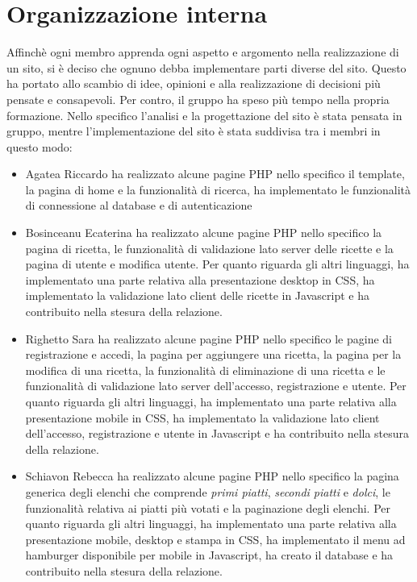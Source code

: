 \section{Organizzazione interna}
Affinchè ogni membro apprenda ogni aspetto e argomento nella realizzazione di un sito, si è deciso che ognuno debba implementare parti diverse del sito. Questo ha portato allo scambio di idee, opinioni e alla realizzazione di decisioni più pensate e consapevoli. Per contro, il gruppo ha speso più tempo nella propria formazione.\newline
Nello specifico l'analisi e la progettazione del sito è stata pensata in gruppo, mentre l'implementazione del sito è stata suddivisa tra i membri in questo modo:
\begin{itemize}
	\item Agatea Riccardo ha realizzato alcune pagine PHP nello specifico il template, la pagina di home e la funzionalità di ricerca, ha implementato le funzionalità di connessione al database e di autenticazione
	\item Bosinceanu Ecaterina ha realizzato alcune pagine PHP nello specifico la pagina di ricetta, le funzionalità di validazione lato server delle ricette e la pagina di utente e modifica utente. Per quanto riguarda gli altri linguaggi, ha implementato una parte relativa alla presentazione desktop in CSS, ha implementato la validazione lato client delle ricette in Javascript e ha contribuito nella stesura della relazione.
	\item Righetto Sara ha realizzato alcune pagine PHP nello specifico le pagine di registrazione e accedi, la pagina per aggiungere una ricetta, la pagina per la modifica di una ricetta, la funzionalità di eliminazione di una ricetta e le funzionalità di validazione lato server dell'accesso, registrazione e utente. Per quanto riguarda gli altri linguaggi, ha implementato una parte relativa alla presentazione mobile in CSS, ha implementato la validazione lato client dell'accesso, registrazione e utente in Javascript e ha contribuito nella stesura della relazione.
	\item Schiavon Rebecca ha realizzato alcune pagine PHP nello specifico la pagina generica degli elenchi che comprende \textit{primi piatti}, \textit{secondi piatti} e \textit{dolci}, le funzionalità relativa ai piatti più votati e la paginazione degli elenchi. Per quanto riguarda gli altri linguaggi, ha implementato una parte relativa alla presentazione mobile, desktop e stampa in CSS, ha implementato il menu ad hamburger disponibile per mobile in Javascript, ha creato il database e ha contribuito nella stesura della relazione.
\end{itemize}
